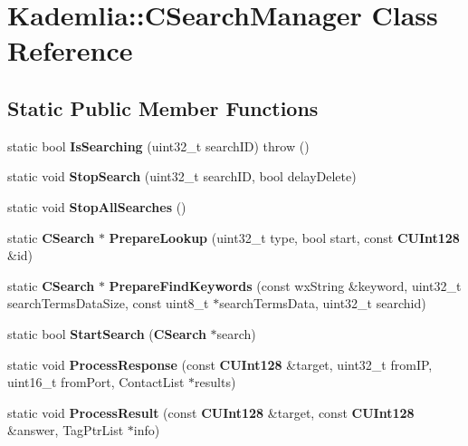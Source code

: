\section{Kademlia::CSearchManager Class Reference}
\label{classKademlia_1_1CSearchManager}
\subsection*{Static Public Member Functions}
\begin{DoxyCompactItemize}
\item 
static bool {\bfseries IsSearching} (uint32\_\-t searchID)  throw ()\label{classKademlia_1_1CSearchManager_a6da7b945f61b093c72d64557ca199d9f}

\item 
static void {\bfseries StopSearch} (uint32\_\-t searchID, bool delayDelete)\label{classKademlia_1_1CSearchManager_a5b6b6ea7fac895be9f6467bfae7443a5}

\item 
static void {\bfseries StopAllSearches} ()\label{classKademlia_1_1CSearchManager_aac794b5fa87512dac398d978d6b25d56}

\item 
static {\bf CSearch} $\ast$ {\bfseries PrepareLookup} (uint32\_\-t type, bool start, const {\bf CUInt128} \&id)\label{classKademlia_1_1CSearchManager_a17d18da9e8e182be50989fa608002939}

\item 
static {\bf CSearch} $\ast$ {\bfseries PrepareFindKeywords} (const wxString \&keyword, uint32\_\-t searchTermsDataSize, const uint8\_\-t $\ast$searchTermsData, uint32\_\-t searchid)\label{classKademlia_1_1CSearchManager_ad3bbcd8801e50088f27b46d1cdd7b81b}

\item 
static bool {\bfseries StartSearch} ({\bf CSearch} $\ast$search)\label{classKademlia_1_1CSearchManager_abafc1294843c43e69c66b5715c02c316}

\item 
static void {\bfseries ProcessResponse} (const {\bf CUInt128} \&target, uint32\_\-t fromIP, uint16\_\-t fromPort, ContactList $\ast$results)\label{classKademlia_1_1CSearchManager_a506f792e3c1f9991a1cf8f3ade9648f9}

\item 
static void {\bfseries ProcessResult} (const {\bf CUInt128} \&target, const {\bf CUInt128} \&answer, TagPtrList $\ast$info)\label{classKademlia_1_1CSearchManager_accf64ad301e031587c45dd9359e72202}


\end{DoxyCompactItemize}
